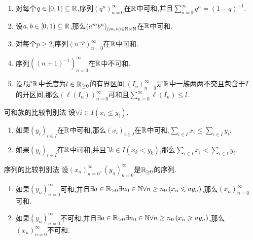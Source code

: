 \begin{example}{}{}
	\begin{enumerate}
		\item 对每个$q\in\left[0,1\right)\subseteq\mathbb{R}$,序列$\left(q^{n}\right)_{n=0}^{\infty}$在$\mathbb{R}$中可和,并且$\sum\limits_{n=0}^{\infty}q^{n}=\left(1-q\right)^{-1}$.
		\item 设$a,b\in\left[0,1\right)\subseteq\mathbb{R}$,那么$\left(a^{m}b^{n}\right)_{\left(m,n\right)\in\mathbb{N}\times\mathbb{N}}$在$\mathbb{R}$中可和.
		\item 对每个$p\geq 2$,序列$\left(n^{-p}\right)_{n=0}^{\infty}$在$\mathbb{R}$中可和.
		\item 序列$((n+1)^{-1})_{n=0}^{\infty}$在$\mathbb{R}$中不可和.
		\item 设$I$是$\mathbb{R}$中长度为$l\in\mathbb{R}_{\geq 0}$的有界区间,$\left(I_{n}\right)_{n=0}^{\infty}$是$\mathbb{R}$中一族两两不交且包含于$I$的开区间,那么$\left(\ell\left(I_{n}\right)\right)_{n=0}^{\infty}$可和且$\sum\limits_{n=0}^{\infty}\ell\left(I_{n}\right)\leq l$.
	\end{enumerate}
\end{example}

\begin{theorem}{可和族的比较判别法}{}
	设$\forall i\in I\left(x_{i}\leq y_{i}\right)$.
	\begin{enumerate}
		\item 如果$\left(y_{i}\right)_{i\in I}$在$\mathbb{R}$中可和,那么$\left(x_{i}\right)_{i\in I}$在$\mathbb{R}$中可和,$\sum\limits_{i\in I}x_{i}\leqslant\sum\limits_{i\in I}y_{i}$.
		\item 如果$\left(y_{i}\right)_{i\in I}$在$\mathbb{R}$中可和,并且$\exists k\in I\left(x_{k}<y_{k}\right)$,那么$\sum\limits_{i\in I}x_{i}<\sum\limits_{i\in I}y_{i}$.
	\end{enumerate}
\end{theorem}

\begin{corollary}{序列的比较判别法}{}
	设$\left(x_{n}\right)_{n=0}^{\infty},\left(y_{n}\right)_{n=0}^{\infty}$是$\mathbb{R}_{\geq 0}$的序列.
	\begin{enumerate}
		\item 如果$\left(y_{n}\right)_{n=0}^{\infty}$可和,并且$\exists a\in\mathbb{R}_{>0}\exists n_{0}\in\mathbb{N}\forall n\geq n_{0}\left(x_{n}\leqslant ay_{n}\right)$,那么$\left(x_{n}\right)_{n=0}^{\infty}$可和.
		\item 如果$\left(y_{n}\right)_{n=0}^{\infty}$不可和,并且$\exists a\in\mathbb{R}_{>0}\exists n_{0}\in\mathbb{N}\forall n\geq n_{0}\left(x_{n}\geqslant ay_{n}\right)$,那么$\left(x_{n}\right)_{n=0}^{\infty}$不可和.
	\end{enumerate}
\end{corollary}


